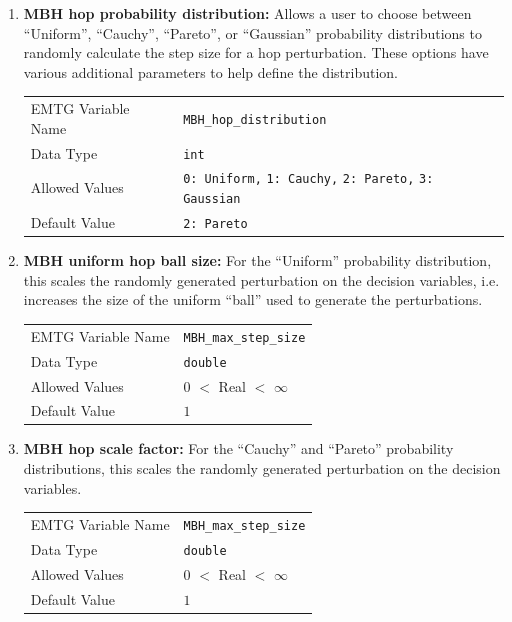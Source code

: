 \begin{enumerate}
    \item \textbf{\ac{MBH} hop probability distribution:} Allows a user to choose between ``Uniform'', ``Cauchy'', ``Pareto'', or ``Gaussian'' probability distributions to randomly calculate the step size for a hop perturbation. These options have various additional parameters to help define the distribution.
    \begin{table}[H]
        \hspace{2cm}
        \begin{tabular}{lp{5cm}}
        \ac{EMTG} Variable Name & \verb|MBH_hop_distribution| \\
        Data Type & \verb|int| \\
        Allowed Values & \verb|0: Uniform,| \newline
                        \verb|1: Cauchy,| \newline
                        \verb|2: Pareto,| \newline
                        \verb|3: Gaussian| \\
        Default Value & \verb|2: Pareto| \\
        \end{tabular}
    \end{table}
    
    \item \textbf{\ac{MBH} uniform hop ball size:} For the ``Uniform'' probability distribution, this scales the randomly generated perturbation on the decision variables, i.e. increases the size of the uniform ``ball'' used to generate the perturbations.
    \begin{table}[H]
        \hspace{2cm}
        \begin{tabular}{lp{5cm}}
        \ac{EMTG} Variable Name & \verb|MBH_max_step_size| \\
        Data Type & \verb|double| \\
        Allowed Values & $0$ $<$ Real $<$ $\infty$ \\
        Default Value & $1$ \\
        \end{tabular}
    \end{table}
    
    \item \textbf{\ac{MBH} hop scale factor:} For the ``Cauchy'' and ``Pareto'' probability distributions, this scales the randomly generated perturbation on the decision variables.
    \begin{table}[H]
        \hspace{2cm}
        \begin{tabular}{lp{5cm}}
        \ac{EMTG} Variable Name & \verb|MBH_max_step_size| \\
        Data Type & \verb|double| \\
        Allowed Values & $0$ $<$ Real $<$ $\infty$ \\
        Default Value & $1$ \\
        \end{tabular}
    \end{table}
    

\end{enumerate}
